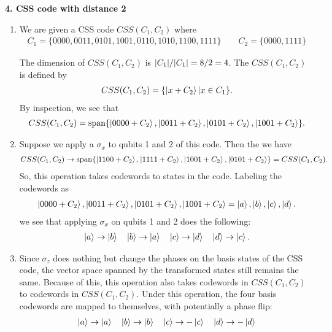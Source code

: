 \documentclass{article}
\theoremstyle{definition}
\begin{document}
\noindent \textbf{4. CSS code with distance 2}

\begin{enumerate}[label=(\alph*)]
	\item We are given a CSS code $CSS(C_1,C_2)$ where
	\begin{align*}
		C_1 = \{ 0000,0011,0101,1001,0110,1010,1100,1111  \} \quad\quad C_2 = \{ 0000, 1111 \}
	\end{align*}
	
	The dimension of $CSS(C_1,C_2)$ is $\abs{C_1}/\abs{C_1} = 8/2 = 4$. The $CSS(C_1, C_2)$ is defined by 
	\begin{align*}
		CSS(C_1, C_2) =  \{ \ket{x+C_2}  \vert x\in C_1 \}.
	\end{align*}
	By inspection, we see that
	\begin{align*}
		CSS(C_1,C_2) = \text{span}\{ \ket{0000+C_2} , \ket{0011+C_2} , \ket{0101+C_2} , \ket{1001+C_2}   \}.
	\end{align*}
	
	
	\item Suppose we apply a $\sigma_x$ to qubits 1 and 2 of this code. Then the we have 
	\begin{align*}
		CSS(C_1,C_2) \to \text{span} \{ \ket{1100+C_2} , \ket{1111+C_2} , \ket{1001+C_2} , \ket{0101+C_2}   \} = CSS(C_1,C_2).
	\end{align*}
	So, this operation takes codewords to states in the code. Labeling the codewords as 
	\begin{align*}
		 \ket{0000+C_2} , \ket{0011+C_2} , \ket{0101+C_2} , \ket{1001+C_2}    =  \ket{a}, \ket{b}, \ket{c}, \ket{d} .
	\end{align*}
	we see that applying $\sigma_x$ on qubits 1 and 2 does the following:
	\begin{align*}
		\ket{a} \to \ket{b} \quad \ket{b} \to \ket{a} \quad \ket{c} \to \ket{d} \quad \ket{d} \to \ket{c}.
	\end{align*}
	
	
	\item Since $\sigma_z$ does nothing but change the phases on the basis states of the CSS code, the vector space spanned by the transformed states still remains the same. Because of this, this operation also takes codewords in $CSS(C_1, C_2)$ to codewords in $CSS(C_1, C_2)$. Under this operation, the four basis codewords are mapped to themselves, with potentially a phase flip:
	\begin{align*}
		\ket{a} \to \ket{a} \quad \ket{b} \to \ket{b} \quad \ket{c} \to - \ket{c} \quad \ket{d} \to -\ket{d}
	\end{align*}
	

\end{enumerate}
\end{document}
